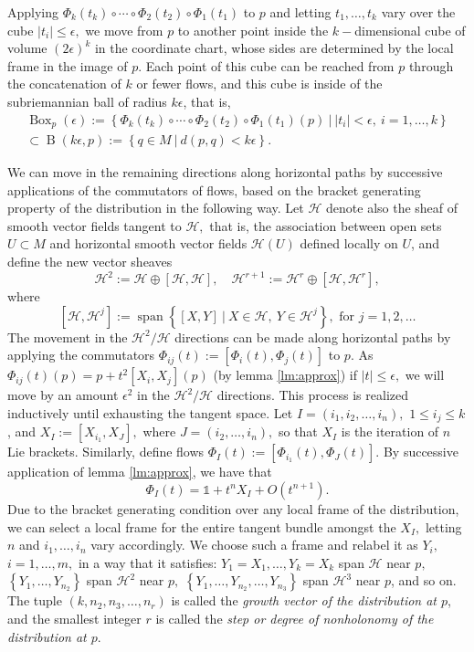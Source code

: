 \documentclass[12pt, letterpaper, reqno]{amsart}
\theoremstyle{definition}
\theoremstyle{plain}
\theoremstyle{remark}
\begin{document}
Applying $ \Phi_k(t_k)\circ\cdots\circ \Phi_2(t_2)\circ\Phi_1(t_1)$ to $ p $ and letting $ t_1,\dots,t_k $ vary over the cube $ |t_i|\leq\epsilon, $ we move from $ p $ to another point inside the $ k- $dimensional  cube of volume $ (2\epsilon)^k$ in the coordinate chart, whose sides are determined by the local frame in the image of $ p $. Each point of this cube can be reached from $ p $ through the concatenation of $ k $ or fewer flows, and this cube is inside of the subriemannian ball of radius $ k\epsilon $, that is,
\begin{align*}
 \operatorname{Box}_p(\epsilon):= \left\{ \Phi_k(t_k)\circ\cdots\circ \Phi_2(t_2)\circ\Phi_1(t_1)(p) \ | \ |t_i|<\epsilon, \ i=1,\dots,k \right\}\\ \subset \operatorname{B}(k\epsilon, p):= \left\{ q\in M \ | \ d(p,q)<k\epsilon \right\}.  
\end{align*}

We can move in the remaining directions along horizontal paths by successive applications of the commutators of flows, based on the bracket generating property of the distribution in the following way. Let $ \mathcal{H} $ denote also the sheaf of smooth vector fields tangent to $ \mathcal{H}, $ that is, the association between open sets $ U\subset M $ and horizontal smooth vector fields $ \mathcal{H}(U) $ defined locally on $ U $, and define the new vector sheaves
$$ \mathcal{H}^2 := \mathcal{H}\oplus [\mathcal{H},\mathcal{H}],\quad \mathcal{H}^{r+1} := \mathcal{H}^r\oplus [\mathcal{H}, \mathcal{H}^r], $$
where
$$ \left[ \mathcal{H}, \mathcal{H}^j \right]:= \operatorname{span} \left\{ [X,Y] \ | \ X\in \mathcal{H},\ Y \in \mathcal{H}^j \right\}, \text{ for }j=1,2,\dots  $$ 
The movement in the $ \mathcal{H}^2/\mathcal{H} $ directions can be made along horizontal paths by applying the commutators $ \Phi_{ij}(t):= [\Phi_i(t),\Phi_j(t)] $ to $ p. $ As $ \Phi_{ij}(t)(p)=p+t^2[X_i, X_j](p) $ (by lemma \ref{lm:approx}) if $ |t|\leq\epsilon, $ we will move by an amount $ \epsilon^2 $ in the $ \mathcal{H}^2/\mathcal{H} $ directions. This process is realized inductively until exhausting the tangent space. Let $ I=(i_1,i_2,\dots,i_n), $ $ 1\leq i_j\leq k $, and $ X_I:=[X_{i_1}, X_J], $ where $ J=(i_2,\dots,i_n), $  so that $ X_I $ is the iteration of $ n $ Lie brackets. Similarly, define flows $ \Phi_I(t):=[\Phi_{i_1}(t), \Phi_J(t)] $. By successive application of lemma \ref{lm:approx}, we have that   
$$ \Phi_I(t)= \mathbb{1} +t^n X_I+ O(t^{n+1}).$$ 
Due to the bracket generating condition over any local frame of the distribution, we can select a local frame for the entire tangent bundle amongst the $ X_I, $ letting $ n $ and $ i_1,\dots,i_n $ vary accordingly. We choose such a frame and relabel it as $ Y_i, $ $ i=1,\dots,m, $ in a way that it satisfies: $ Y_1=X_1,\dots, Y_k=X_k $ span $ \mathcal{H} $ near $ p, $ $ \left\{ Y_1,\dots,Y_{n_2} \right\} $ span $ \mathcal{H}^2 $ near $ p, $ $ \left\{ Y_1,\dots,Y_{n_2},\dots,Y_{n_3} \right\} $ span $ \mathcal{H}^3 $ near $ p $,  and so on. The tuple $ (k,n_2,n_3,\dots, n_r) $ is called the \textit{growth vector of the distribution at $ p $}, and the smallest integer $ r $ is called the \textit{step or degree of nonholonomy of the distribution at $ p. $ }   
\end{document}
